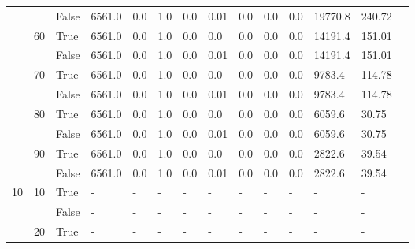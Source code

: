 \documentclass{article}
\begin{document}
\begin{landscape}
\begin{small}
\begin{longtable}[c]{@{}lll|ll|ll|ll|ll|lll@{}}
   &    & False & 6561.0          & 0.0            & 1.0           & 0.0           & 0.01          & 0.0           & 0.0           & 0.0           & 19770.8       & 240.72      &  \\
   & 60 & True  & 6561.0          & 0.0            & 1.0           & 0.0           & 0.0           & 0.0           & 0.0           & 0.0           & 14191.4       & 151.01      &  \\
   &    & False & 6561.0          & 0.0            & 1.0           & 0.0           & 0.01          & 0.0           & 0.0           & 0.0           & 14191.4       & 151.01      &  \\
   & 70 & True  & 6561.0          & 0.0            & 1.0           & 0.0           & 0.0           & 0.0           & 0.0           & 0.0           & 9783.4        & 114.78      &  \\
   &    & False & 6561.0          & 0.0            & 1.0           & 0.0           & 0.01          & 0.0           & 0.0           & 0.0           & 9783.4        & 114.78      &  \\
   & 80 & True  & 6561.0          & 0.0            & 1.0           & 0.0           & 0.0           & 0.0           & 0.0           & 0.0           & 6059.6        & 30.75       &  \\
   &    & False & 6561.0          & 0.0            & 1.0           & 0.0           & 0.01          & 0.0           & 0.0           & 0.0           & 6059.6        & 30.75       &  \\
   & 90 & True  & 6561.0          & 0.0            & 1.0           & 0.0           & 0.0           & 0.0           & 0.0           & 0.0           & 2822.6        & 39.54       &  \\
   &    & False & 6561.0          & 0.0            & 1.0           & 0.0           & 0.01          & 0.0           & 0.0           & 0.0           & 2822.6        & 39.54       &  \\
  \midrule
10 & 10 & True  & -               & -              & -             & -             & -             & -             & -             & -             & -             & -           &  \\
   &    & False & -               & -              & -             & -             & -             & -             & -             & -             & -             & -           &  \\
   & 20 & True  & -               & -              & -             & -             & -             & -             & -             & -             & -             & -           &  \\

\end{longtable}
\end{small}
\end{landscape}
\end{document}
